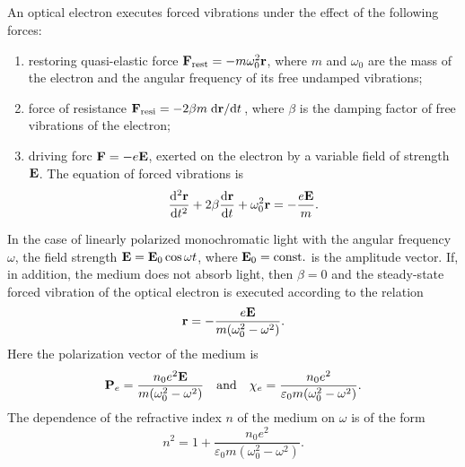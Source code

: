 \subsection{}\label{34.5.2} An optical electron executes forced vibrations under the effect of the following forces:
\begin{enumerate}[label=(\alph*)]
\item restoring quasi-elastic force  $\vb{F}_{\text{rest}} = - m \omega_{0}^{2} \vb{r}$, where
$m$ and $\omega_{0}$ are the mass of the electron and the angular frequency of its free undamped vibrations;
\item force of resistance $\vb{F}_{\text{resi}} = -2\beta m \dv*{\vb{r}}{t}$, where $\beta$ is the damping factor of free vibrations of the electron;
\item driving forc $\vb{F} = -e\vb{E}$, exerted on the electron by a variable field of strength $\vb{E}$.
The equation of forced vibrations is
\begin{equation*}%
\dv[2]{\vb{r}}{t} + 2 \beta \dv{\vb{r}}{t} + \omega_{0}^{2}\vb{r} = - \frac{e \vb{E}}{m}.
\end{equation*}
\end{enumerate}

In the case of linearly polarized monochromatic light with the
angular frequency $\omega$, the field strength $\vb{E} = \vb{E}_{0} \cos \omega t$, where $\vb{E}_{0} = \text{const.}$ is the amplitude vector. If, in addition, the medium does not absorb light, then $\beta = 0$ and the steady-state forced vibration of the optical electron is executed according to the relation
\begin{equation*}%
\vb{r} = - \frac{e \vb{E}}{m (\omega_{0}^{2} - \omega^{2})}.
\end{equation*}
Here the polarization vector of the medium is
\begin{equation*}%
\vb{P}_{e} =  \frac{n_{0}e^{2} \vb{E}}{m (\omega_{0}^{2} - \omega^{2})} \qand \chi_{e} =  \frac{n_{0}e^{2} }{\varepsilon_{0} m (\omega_{0}^{2} - \omega^{2})}.
\end{equation*}
The dependence of the refractive index $n$ of the medium on $\omega$ is of the form
\begin{equation*}%
n^{2} = 1 + \frac{n_{0} e^{2}}{\varepsilon_{0} m (\omega_{0}^{2} - \omega^{2})}.
\end{equation*}

